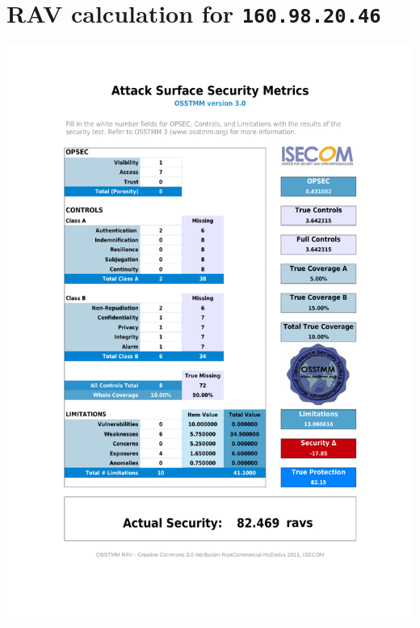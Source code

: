 \documentclass[10pt,a4paper,twoside,onecolumn]{article}
\begin{document}
\clearpage
\section{RAV calculation for \texttt{160.98.20.46}}
\includegraphics[width=\textwidth,trim=84pt 110pt 84pt 140pt,clip=true]{data/160982046.pdf}

\clearpage
\end{document}
